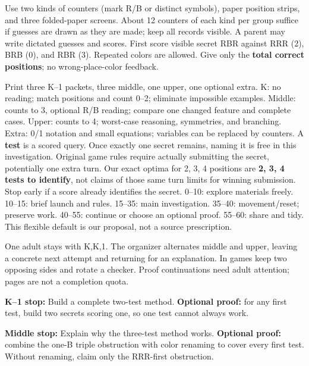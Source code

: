 \documentclass[11pt]{article}
\begin{document}
Use two kinds of counters (mark R/B or distinct symbols), paper position strips, and three folded-paper screens. About 12 counters of each kind per group suffice if guesses are drawn as they are made; keep all records visible. A parent may write dictated guesses and scores. First score visible secret RBR against RRR (2), BRB (0), and RBR (3). Repeated colors are allowed. Give only the \textbf{total correct positions}; no wrong-place-color feedback.

Print three K--1 packets, three middle, one upper, one optional extra. K: no reading; match positions and count 0--2; eliminate impossible examples. Middle: counts to 3, optional R/B reading; compare one changed feature and complete cases. Upper: counts to 4; worst-case reasoning, symmetries, and branching. Extra: 0/1 notation and small equations; variables can be replaced by counters.
A \textbf{test} is a scored query. Once exactly one secret remains, naming it is free in this investigation. Original game rules require actually submitting the secret, potentially one extra turn. Our exact optima for 2, 3, 4 positions are \textbf{2, 3, 4 tests to identify}, not claims of those same turn limits for winning submission. Stop early if a score already identifies the secret.
0--10: explore materials freely. 10--15: brief launch and rules. 15--35: main investigation. 35--40: movement/reset; preserve work. 40--55: continue or choose an optional proof. 55--60: share and tidy. This flexible default is our proposal, not a source prescription.

One adult stays with K,K,1. The organizer alternates middle and upper, leaving a concrete next attempt and returning for an explanation. In games keep two opposing sides and rotate a checker. Proof continuations need adult attention; pages are not a completion quota.

\textbf{K--1 stop:} Build a complete two-test method. \textbf{Optional proof:} for any first test, build two secrets scoring one, so one test cannot always work.

\textbf{Middle stop:} Explain why the three-test method works. \textbf{Optional proof:} combine the one-B triple obstruction with color renaming to cover every first test. Without renaming, claim only the RRR-first obstruction.
\end{document}
